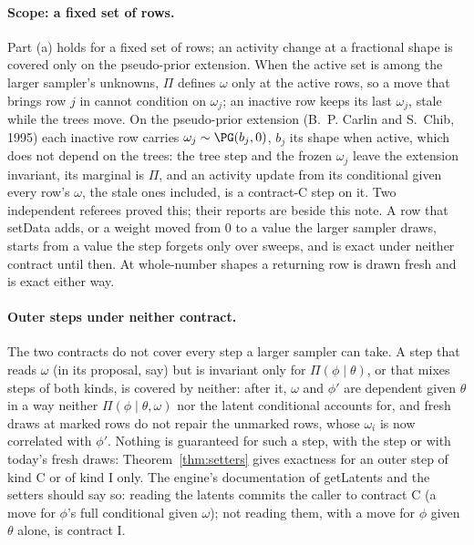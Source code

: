 \paragraph{Scope: a fixed set of rows.} Part (a) holds for a fixed set of rows; an activity change at a
fractional shape is covered only on the pseudo-prior extension. When the active set is among the larger sampler's
unknowns, $\Pi$ defines $\omega$ only at the active rows, so a move that brings row $j$ in cannot condition on
$\omega_j$; an inactive row keeps its last $\omega_j$, stale while the trees move. On the pseudo-prior extension
(B.~P. Carlin and S.~Chib, 1995) each inactive row carries $\omega_j\sim\PG(b_j,0)$, $b_j$ its shape when
active, which does not depend on the trees: the tree step and the frozen $\omega_j$ leave the extension invariant,
its marginal is $\Pi$, and an activity update from its conditional given every row's $\omega$, the stale ones
included, is a contract-C step on it. Two independent referees proved this; their reports are beside this note. A
row that setData adds, or a weight moved from 0 to a value the larger sampler draws, starts from a value the step
forgets only over sweeps, and is exact under neither contract until then. At whole-number shapes a returning row
is drawn fresh and is exact either way.

\paragraph{Outer steps under neither contract.} The two contracts do not cover every step a larger sampler can
take. A step that reads $\omega$ (in its proposal, say) but is invariant only for $\Pi(\phi\mid\theta)$, or that
mixes steps of both kinds, is covered by neither: after it, $\omega$ and $\phi'$ are dependent given $\theta$ in a
way neither $\Pi(\phi\mid\theta,\omega)$ nor the latent conditional accounts for, and fresh draws at marked rows do
not repair the unmarked rows, whose $\omega_i$ is now correlated with $\phi'$. Nothing is guaranteed for such a
step, with the step or with today's fresh draws: Theorem~\ref{thm:setters} gives exactness for an outer step of
kind C or of kind I only. The engine's documentation of getLatents and the setters should say so: reading the
latents commits the caller to contract C (a move for $\phi$'s full conditional given $\omega$); not reading them,
with a move for $\phi$ given $\theta$ alone, is contract I.

